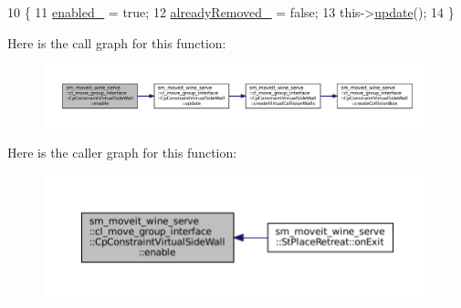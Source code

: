 \begin{DoxyCode}
10         \{
11             \hyperlink{classsm__moveit__wine__serve_1_1cl__move__group__interface_1_1CpConstraintVirtualSideWall_a41d715b981297010db4d8760244b2e8c}{enabled\_} = \textcolor{keyword}{true};
12             \hyperlink{classsm__moveit__wine__serve_1_1cl__move__group__interface_1_1CpConstraintVirtualSideWall_a18d4b515ae9f0ce6478f9e205431f06d}{alreadyRemoved\_} = \textcolor{keyword}{false};
13             this->\hyperlink{classsm__moveit__wine__serve_1_1cl__move__group__interface_1_1CpConstraintVirtualSideWall_a455681238d7baaaa5aa0f1e625864f3a}{update}();
14         \}
\end{DoxyCode}
Here is the call graph for this function\+:
\nopagebreak
\begin{figure}[H]
\begin{center}
\leavevmode
\includegraphics[width=350pt]{classsm__moveit__wine__serve_1_1cl__move__group__interface_1_1CpConstraintVirtualSideWall_a01cda66eb871a0cf5e24f84d9a06a343_cgraph}
\end{center}
\end{figure}
Here is the caller graph for this function\+:
\nopagebreak
\begin{figure}[H]
\begin{center}
\leavevmode
\includegraphics[width=350pt]{classsm__moveit__wine__serve_1_1cl__move__group__interface_1_1CpConstraintVirtualSideWall_a01cda66eb871a0cf5e24f84d9a06a343_icgraph}
\end{center}
\end{figure}
\mbox{\label{classsm__moveit__wine__serve_1_1cl__move__group__interface_1_1CpConstraintVirtualSideWall_ac15d37921d1969b4be0f5ea3e2345c24}} 

